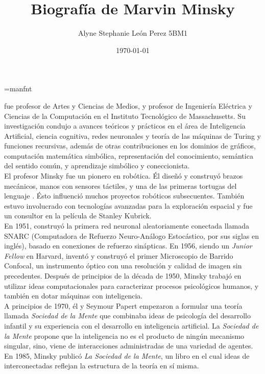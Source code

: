 \documentclass[a4paper,12pt]{article}
\begin{document}
\title{Biografía de Marvin Minsky \cite{texbook}}
\author{Alyne Stephanie León Perez 5BM1}
\date{\today}
\maketitle
\font\logo=manfnt 
\def\MF{{\logo META}\-{\logo FONT}}

 fue profesor  de Artes y Ciencias de Medios, y profesor de Ingeniería Eléctrica y Ciencias de la Computación en el Instituto Tecnológico de Massachusetts. Su investigación condujo a avances teóricos y prácticos en el área de Inteligencia Artificial, ciencia cognitiva, redes neuronales y teoría de las máquinas de Turing y funciones recursivas, además de otras contribuciones en los dominios de gráficos, computación matemática simbólica, representación del conocimiento, semántica del sentido común, y aprendizaje simbólico y coneccionista.\\
El profesor Minsky fue un pionero en robótica. Él diseñó y construyó brazos mecánicos, manos con sensores táctiles, y una de las primeras tortugas del lenguaje . Ésto influenció muchos proyectos robóticos subsecuentes. También estuvo involucrado con tecnologías avanzadas para la exploración espacial y fue un consultor en la película  de Stanley Kubrick.\\
En 1951, construyó la primera red neuronal aleatoriamente conectada llamada SNARC (Computadora de Refuerzo Neuro-Análogo Estocástico, por sus siglas en inglés), basado en conexiones de refuerzo sinápticas. En 1956, siendo un \textit{Junior Fellow} en Harvard, inventó y construyó el primer Microscopio de Barrido Confocal, un instrumento óptico con una resolución y calidad de imagen sin precedentes. Después de principios de la década de 1950, Minsky trabajó en utilizar ideas computacionales para caracterizar procesos psicológicos humanos, y también en dotar máquinas con inteligencia.\\
A principios de 1970, él y Seymour Papert empezaron a formular una teoría llamada \textit{Sociedad de la Mente} que combinaba ideas de psicología del desarrollo infantil y su experiencia con el desarrollo en inteligencia artificial. La \textit{Sociedad de la Mente} propone que la inteligencia no es el producto de ningún mecanismo singular, sino, viene de interacciones administradas de una variedad de agentes.\\
En 1985, Minsky publicó \textit{La Sociedad de la Mente}, un libro en el cual ideas de  interconectadas reflejan la estructura de la teoría en sí misma.\\
\end{document}
